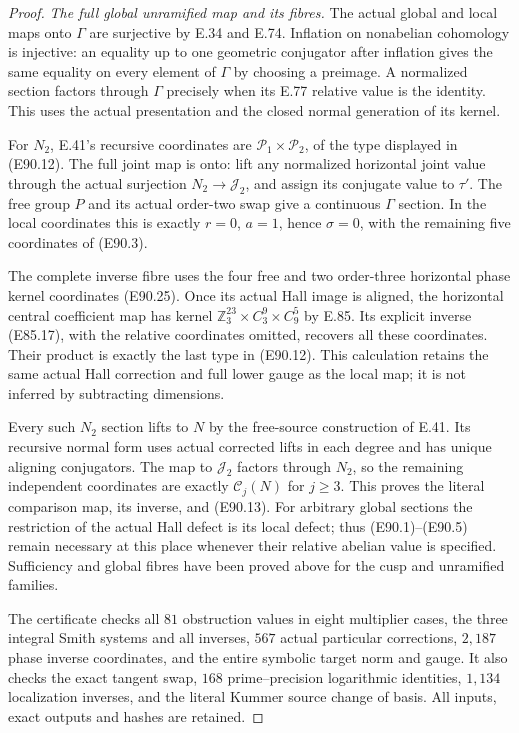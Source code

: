 \begin{proof}
\emph{The full global unramified map and its fibres.}
The actual global and local maps onto
$\Gamma$ are surjective by E.34 and E.74.
Inflation on nonabelian cohomology is
injective: an equality up to one geometric
conjugator after inflation gives the same
equality on every element of $\Gamma$ by
choosing a preimage. A normalized section
factors through $\Gamma$ precisely when
its E.77 relative value is the identity.
This uses the actual presentation and
the closed normal generation of its kernel.

For $N_2$, E.41's recursive coordinates are
$\mathcal P_1\times\mathcal P_2$, of the
type displayed in (E90.12). The full joint
map is onto: lift any normalized horizontal
joint value through the actual surjection
$N_2\to\mathcal J_2$, and assign its conjugate
value to $\tau'$. The free group $P$ and
its actual order-two swap give a continuous
$\Gamma$ section. In the local coordinates
this is exactly $r=0$, $a=1$, hence
$\sigma=0$, with the remaining five
coordinates of (E90.3).

The complete inverse fibre uses the four
free and two order-three horizontal phase
kernel coordinates (E90.25). Once its
actual Hall image is aligned, the horizontal
central coefficient map has kernel
$\mathbb Z_3^{23}\times C_3^9\times C_9^5$
by E.85. Its explicit inverse (E85.17),
with the relative coordinates omitted,
recovers all these coordinates. Their
product is exactly the last type in
(E90.12). This calculation retains the
same actual Hall correction and full
lower gauge as the local map; it is not
inferred by subtracting dimensions.

Every such $N_2$ section lifts to $N$
by the free-source construction of E.41.
Its recursive normal form uses actual
corrected lifts in each degree and has
unique aligning conjugators. The map to
$\mathcal J_2$ factors through $N_2$, so
the remaining independent coordinates
are exactly $\mathcal C_j(N)$ for $j\ge3$.
This proves the literal comparison map,
its inverse, and (E90.13). For arbitrary
global sections the restriction of the
actual Hall defect is its local defect;
thus (E90.1)--(E90.5) remain necessary
at this place whenever their relative
abelian value is specified. Sufficiency
and global fibres have been proved above
for the cusp and unramified families.

The certificate checks all $81$ obstruction
values in eight multiplier cases, the three
integral Smith systems and all inverses,
$567$ actual particular corrections,
$2,187$ phase inverse coordinates, and
the entire symbolic target norm and gauge.
It also checks the exact tangent swap,
$168$ prime--precision logarithmic identities,
$1,134$ localization inverses, and the
literal Kummer source change of basis.
All inputs, exact outputs and hashes are retained.
\end{proof}
